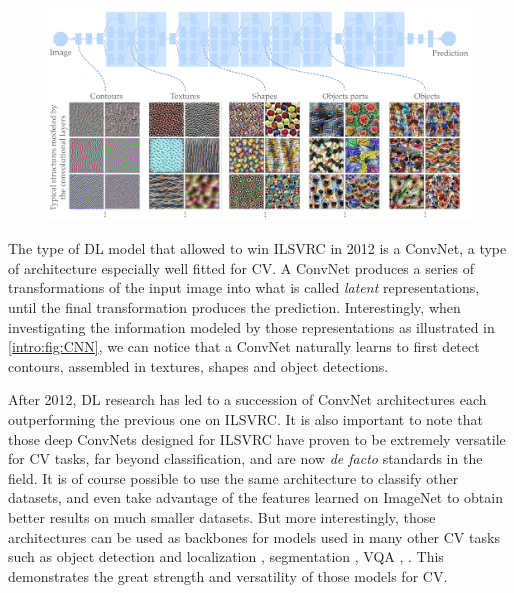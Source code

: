 \begin{figure}[tb]
	\centering
	\includegraphics[width=\linewidth]{images/intro_CNN}
	\label{intro:fig:CNN}
\end{figure}

The type of \acf{DL} model that allowed \citet{alexnet} to win \ac{ILSVRC} in 2012 is a \acf{ConvNet}, a type of architecture especially well fitted for \ac{CV}. A \ac{ConvNet} produces a series of transformations of the input image into what is called \textit{latent} representations, until the final transformation produces the prediction. Interestingly, when investigating the information modeled by those representations \citep{olah2017feature} as illustrated in \autoref{intro:fig:CNN}, we can notice that a \ac{ConvNet} naturally learns to first detect contours, assembled in textures, shapes and object detections.

After 2012, \ac{DL} research has led to a succession of \ac{ConvNet} architectures each outperforming the previous one on \ac{ILSVRC}. It is also important to note that those deep \acp{ConvNet} designed for \ac{ILSVRC} have proven to be extremely versatile for \ac{CV} tasks, far beyond classification, and are now \textit{de facto} standards in the field. It is of course possible to use the same architecture to classify other datasets, and even take advantage of the features learned on ImageNet to obtain better results on much smaller datasets. But more interestingly, those architectures can be used as backbones for models used in many other \ac{CV} tasks such as object detection and localization \citep[\eg Faster R-CNN uses VGG-16, \textit{cf.}][]{ren2015faster}, segmentation \citep[DeepLab uses VGG-16 or ResNet-101, \textit{cf.}][]{chen2017deeplab}, \ac{VQA} \citep[MUTAN uses ResNet-152, \textit{cf.}][]{ben2017mutan}, \etc. This demonstrates the great strength and versatility of those models for \acf{CV}.

